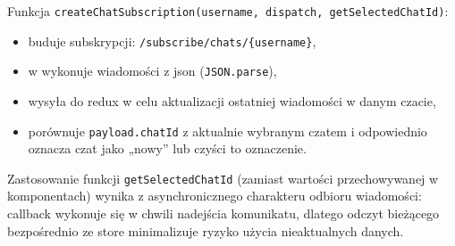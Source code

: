 Funkcja \texttt{createChatSubscription(username, dispatch, getSelectedChatId)}:
\begin{itemize}
    \item buduje  subskrypcji: \texttt{/subscribe/chats/\{username\}},
    \item w  wykonuje  wiadomości z \gls{json} (\texttt{JSON.parse}),
    \item wysyła  do \gls{redux} w celu aktualizacji ostatniej wiadomości w danym czacie,
    \item porównuje \texttt{payload.chatId} z aktualnie wybranym czatem i odpowiednio oznacza czat jako „nowy”
    lub czyści to oznaczenie.
\end{itemize}

Zastosowanie funkcji \texttt{getSelectedChatId} (zamiast wartości przechowywanej w komponentach)
wynika z asynchronicznego charakteru odbioru wiadomości: \gls{callback} wykonuje się w chwili nadejścia komunikatu,
dlatego odczyt bieżącego  bezpośrednio ze \gls{store} minimalizuje ryzyko użycia nieaktualnych danych.

\setcounter{secnumdepth}{3}
\setcounter{tocdepth}{3}
